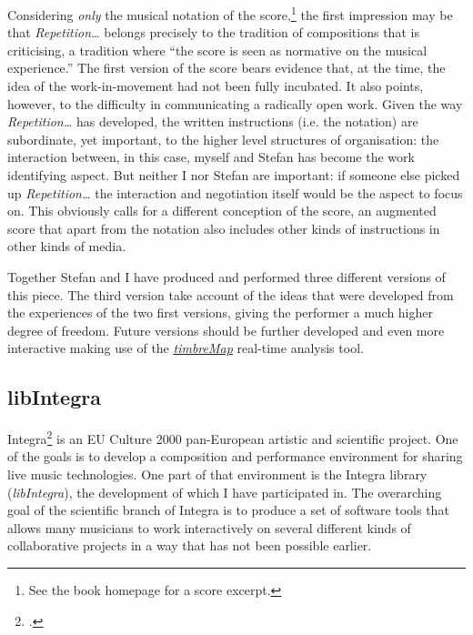 
Considering \emph{only} the musical notation of the score,\footnote{See the book homepage for a score excerpt.} the first impression may be that \emph{Repetition\ldots} belongs precisely to the tradition of compositions that \citeauthor{wis96} is criticising, a tradition where ``the score is seen as normative on the musical experience.'' The first version of the score bears evidence that, at the time, the idea of the work-in-movement had not been fully incubated. It also points, however, to the difficulty in communicating a radically open work. Given the way \emph{Repetition\ldots} has developed, the written instructions (i.e. the notation) are subordinate, yet important, to the higher level structures of organisation: the interaction between, in this case, myself and Stefan has become the work identifying aspect. But neither I nor Stefan are important: if someone else picked up \emph{Repetition\ldots} the interaction and negotiation itself would be the aspect to focus on. This obviously calls for a different conception of the score, an augmented score that apart from the notation also includes other kinds of instructions in other kinds of media.

Together Stefan and I have produced and performed three different versions of this piece. The third version take account of the ideas that were developed from the experiences of the two first versions, giving the performer a much higher degree of freedom. Future versions should be further developed and even more interactive making use of the \hyperref[sec:timbremap]{\emph{timbreMap}} real-time analysis tool. 

\newpage

\subsection{libIntegra}
\label{sec:libintegra}


Integra\footcite{integra-web} is an EU Culture 2000 pan-European artistic and scientific project. One of the goals is to develop a composition and performance environment for sharing live music technologies. One part of that environment is the Integra library (\emph{libIntegra}), the development of which I have participated in. The overarching goal of the scientific branch of Integra is to produce a set of software tools that allows many musicians to work interactively on several different kinds of collaborative projects in a way that has not been possible earlier.

